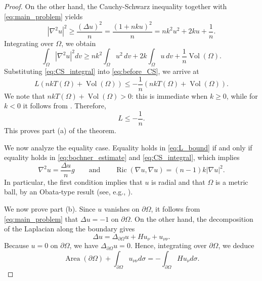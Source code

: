 \documentclass[reqno,11pt]{amsart}
\numberwithin{equation}{section}  %
\begin{document}
\begin{proof}
On the other hand, the Cauchy-Schwarz inequality together with \eqref{eq:main_problem} yields
\[|\nabla^2 u|^2\geq \frac{(\Delta u)^2}{n} = \frac{(1+nku)^2}{n} = nk^2 u^2 +2ku +\frac{1}{n}.\]
Integrating over $\Omega$, we obtain
\begin{equation}\label{eq:CS_integral}
\int_{\Omega}|\nabla^2 u|^2dv\geq nk^2\int_{\Omega}u^2\, dv +2k\int_{\Omega}u\, dv +\frac{1}{n}\operatorname{Vol}(\Omega).
\end{equation}
Substituting \eqref{eq:CS_integral} into \eqref{eq:before_CS}, we arrive at
\[L\left(nkT(\Omega) + \operatorname{Vol}(\Omega)\right)\leq -\frac{1}{n}\left(nkT(\Omega) + \operatorname{Vol}(\Omega)\right).\]
We note that $nkT(\Omega) + \operatorname{Vol}(\Omega) > 0$: this is immediate when $k\geq 0$, while for $k<0$ it follows from \cite[Lemma 5.2]{andrade2025}. Therefore,
\begin{equation}\label{eq:L_bound}
L\leq -\frac{1}{n}.
\end{equation}
This proves part (a) of the theorem.

We now analyze the equality case. Equality holds in \eqref{eq:L_bound} if and only if equality holds in \eqref{eq:bochner_estimate} and \eqref{eq:CS_integral}, which implies
\begin{equation}\label{eq:rigidity_conditions}
\nabla^2 u = \frac{\Delta u}{n} g\qquad\text{and}\qquad \operatorname{Ric}(\nabla u,\nabla u) = (n-1)k|\nabla u|^2.
\end{equation}
In particular, the first condition implies that $u$ is radial and that $\Omega$ is a metric ball, by an Obata-type result (see, e.g., \cite[Lemma 6]{farina2022}).

We now prove part (b). Since $u$ vanishes on $\partial\Omega$, it follows from \eqref{eq:main_problem} that $\Delta u = -1$ on $\partial\Omega$. On the other hand, the decomposition of the Laplacian along the boundary gives
\[\Delta u = \Delta_{\partial\Omega}u + Hu_{\nu} + u_{\nu\nu}.\]
Because $u = 0$ on $\partial\Omega$, we have $\Delta_{\partial\Omega}u = 0$. Hence, integrating over $\partial\Omega$, we deduce
\begin{equation}\label{eq:boundary_decomposition}
\operatorname{Area}(\partial\Omega) + \int_{\partial\Omega}u_{\nu\nu}d\sigma = -\int_{\partial\Omega}Hu_{\nu}d\sigma.
\end{equation}


\end{proof}
\end{document}
